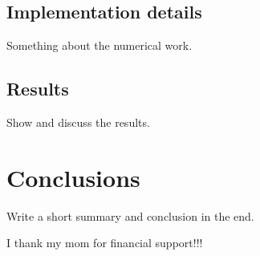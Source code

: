 \documentclass{aa}
\begin{document}
\subsection{Implementation details}
Something about the numerical work.

\subsection{Results}
Show and discuss the results.

\section{Conclusions}

Write a short summary and conclusion in the end. 

\begin{acknowledgements}
      I thank my mom for financial support!!!
\end{acknowledgements}

%


%
\end{document}
